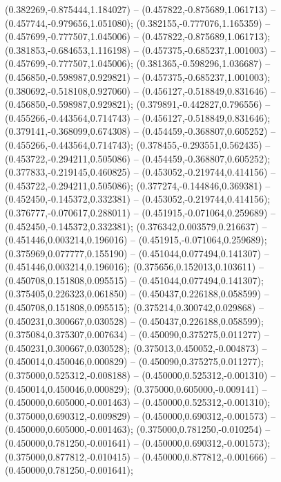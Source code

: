  (0.382269,-0.875444,1.184027) -- (0.457822,-0.875689,1.061713) -- (0.457744,-0.979656,1.051080);
 (0.382155,-0.777076,1.165359) -- (0.457699,-0.777507,1.045006) -- (0.457822,-0.875689,1.061713);
 (0.381853,-0.684653,1.116198) -- (0.457375,-0.685237,1.001003) -- (0.457699,-0.777507,1.045006);
 (0.381365,-0.598296,1.036687) -- (0.456850,-0.598987,0.929821) -- (0.457375,-0.685237,1.001003);
 (0.380692,-0.518108,0.927060) -- (0.456127,-0.518849,0.831646) -- (0.456850,-0.598987,0.929821);
 (0.379891,-0.442827,0.796556) -- (0.455266,-0.443564,0.714743) -- (0.456127,-0.518849,0.831646);
 (0.379141,-0.368099,0.674308) -- (0.454459,-0.368807,0.605252) -- (0.455266,-0.443564,0.714743);
 (0.378455,-0.293551,0.562435) -- (0.453722,-0.294211,0.505086) -- (0.454459,-0.368807,0.605252);
 (0.377833,-0.219145,0.460825) -- (0.453052,-0.219744,0.414156) -- (0.453722,-0.294211,0.505086);
 (0.377274,-0.144846,0.369381) -- (0.452450,-0.145372,0.332381) -- (0.453052,-0.219744,0.414156);
 (0.376777,-0.070617,0.288011) -- (0.451915,-0.071064,0.259689) -- (0.452450,-0.145372,0.332381);
 (0.376342,0.003579,0.216637) -- (0.451446,0.003214,0.196016) -- (0.451915,-0.071064,0.259689);
 (0.375969,0.077777,0.155190) -- (0.451044,0.077494,0.141307) -- (0.451446,0.003214,0.196016);
 (0.375656,0.152013,0.103611) -- (0.450708,0.151808,0.095515) -- (0.451044,0.077494,0.141307);
 (0.375405,0.226323,0.061850) -- (0.450437,0.226188,0.058599) -- (0.450708,0.151808,0.095515);
 (0.375214,0.300742,0.029868) -- (0.450231,0.300667,0.030528) -- (0.450437,0.226188,0.058599);
 (0.375084,0.375307,0.007634) -- (0.450090,0.375275,0.011277) -- (0.450231,0.300667,0.030528);
 (0.375013,0.450052,-0.004873) -- (0.450014,0.450046,0.000829) -- (0.450090,0.375275,0.011277);
 (0.375000,0.525312,-0.008188) -- (0.450000,0.525312,-0.001310) -- (0.450014,0.450046,0.000829);
 (0.375000,0.605000,-0.009141) -- (0.450000,0.605000,-0.001463) -- (0.450000,0.525312,-0.001310);
 (0.375000,0.690312,-0.009829) -- (0.450000,0.690312,-0.001573) -- (0.450000,0.605000,-0.001463);
 (0.375000,0.781250,-0.010254) -- (0.450000,0.781250,-0.001641) -- (0.450000,0.690312,-0.001573);
 (0.375000,0.877812,-0.010415) -- (0.450000,0.877812,-0.001666) -- (0.450000,0.781250,-0.001641);
